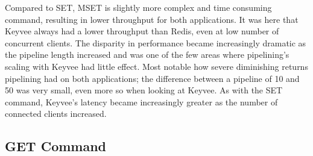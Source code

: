 \documentclass[english,10pt,twocolumn]{article}
\begin{document}
Compared to SET, MSET is slightly more complex and time consuming command, resulting in lower throughput for both applications.
It was here that Keyvee always had a lower throughput than Redis, even at low number of concurrent clients. 
The disparity in performance became increasingly dramatic as the pipeline length increased and was one of the few areas where pipelining's scaling with Keyvee had little effect.
Most notable how severe diminishing returns pipelining had on both applications; the difference between a pipeline of 10 and 50 was very small, even more so when looking at Keyvee.
As with the SET command, Keyvee's latency became increasingly greater as the number of connected clients increased.

\subsection{GET Command}
\end{document}
